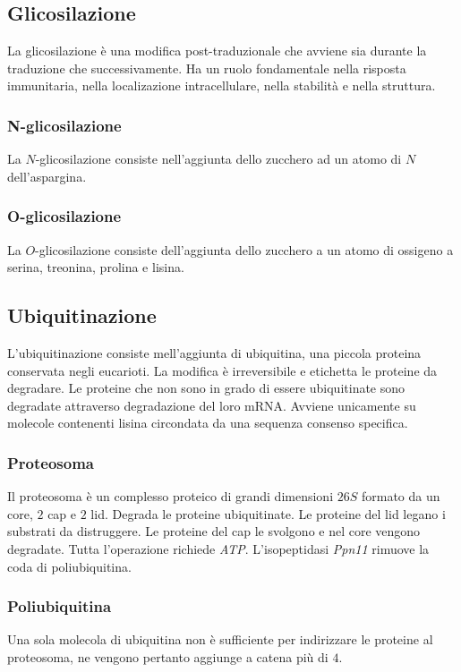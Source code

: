 	\subsection{Glicosilazione}
	La glicosilazione \`e una modifica post-traduzionale che avviene sia durante la traduzione che successivamente.
	Ha un ruolo fondamentale nella risposta immunitaria, nella localizazione intracellulare, nella stabilit\`a e nella struttura.

		\subsubsection{N-glicosilazione}
		La $N$-glicosilazione consiste nell'aggiunta dello zucchero ad un atomo di $N$ dell'aspargina.

		\subsubsection{O-glicosilazione}
		La $O$-glicosilazione consiste dell'aggiunta dello zucchero a un atomo di ossigeno a serina, treonina, prolina e lisina.

	\subsection{Ubiquitinazione}
	L'ubiquitinazione consiste mell'aggiunta di ubiquitina, una piccola proteina conservata negli eucarioti.
	La modifica \`e irreversibile e etichetta le proteine da degradare.
	Le proteine che non sono in grado di essere ubiquitinate sono degradate attraverso degradazione del loro mRNA.
	Avviene unicamente su molecole contenenti lisina circondata da una sequenza consenso specifica.

		\subsubsection{Proteosoma}
		Il proteosoma \`e un complesso proteico di grandi dimensioni $26S$ formato da un core, $2$ cap e $2$ lid.
		Degrada le proteine ubiquitinate.
		Le proteine del lid legano i substrati da distruggere.
		Le proteine del cap le svolgono e nel core vengono degradate.
		Tutta l'operazione richiede \emph{ATP}.
		L'isopeptidasi \emph{Ppn11} rimuove la coda di poliubiquitina.

		\subsubsection{Poliubiquitina}
		Una sola molecola di ubiquitina non \`e sufficiente per indirizzare le proteine al proteosoma, ne vengono pertanto aggiunge a catena pi\`u di $4$.


